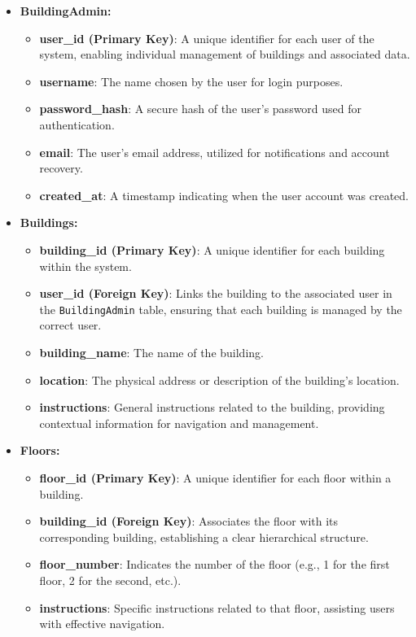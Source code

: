 \begin{itemize}
	\item \textbf{BuildingAdmin:}
	\begin{itemize}
		\item \textbf{user\_id (Primary Key)}: A unique identifier for each user of the system, enabling individual management of buildings and associated data.
		\item \textbf{username}: The name chosen by the user for login purposes.
		\item \textbf{password\_hash}: A secure hash of the user's password used for authentication.
		\item \textbf{email}: The user's email address, utilized for notifications and account recovery.
		\item \textbf{created\_at}: A timestamp indicating when the user account was created.
	\end{itemize}
	
	\item \textbf{Buildings:}
	\begin{itemize}
		\item \textbf{building\_id (Primary Key)}: A unique identifier for each building within the system.
		\item \textbf{user\_id (Foreign Key)}: Links the building to the associated user in the \texttt{BuildingAdmin} table, ensuring that each building is managed by the correct user.
		\item \textbf{building\_name}: The name of the building.
		\item \textbf{location}: The physical address or description of the building's location.
		\item \textbf{instructions}: General instructions related to the building, providing contextual information for navigation and management.
	\end{itemize}
	
	\item \textbf{Floors:}
	\begin{itemize}
		\item \textbf{floor\_id (Primary Key)}: A unique identifier for each floor within a building.
		\item \textbf{building\_id (Foreign Key)}: Associates the floor with its corresponding building, establishing a clear hierarchical structure.
		\item \textbf{floor\_number}: Indicates the number of the floor (e.g., 1 for the first floor, 2 for the second, etc.).
		\item \textbf{instructions}: Specific instructions related to that floor, assisting users with effective navigation.
	\end{itemize}
	

\end{itemize}
